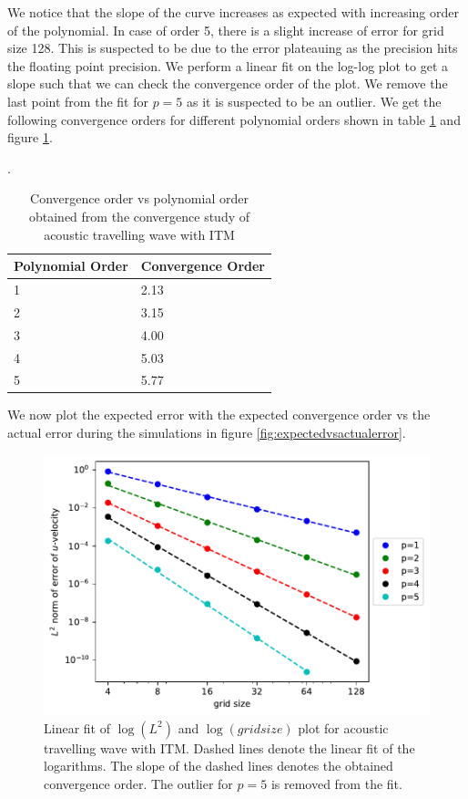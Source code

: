 We notice that the slope of the curve increases as expected with increasing order of the polynomial. In case of order 5, there is a slight increase
of error for grid size 128. This is suspected to be due to the error plateauing as the precision hits the floating point precision. We perform a linear fit on the log-log
plot to get a slope such that we can check the convergence order of the plot. We remove the last point from the fit for $p=5$ as it is suspected to be an outlier. 
We get the following convergence orders for different polynomial orders shown in table \ref{table:convergenceorder} and figure \ref{fig:convergenceorder}.

\begin{center}
\begin{table}[htpb]
    \centering
    \caption{Convergence order vs polynomial order obtained from the convergence study of acoustic travelling wave with \ac{ITM}}.
    \label{table:convergenceorder}
    \begin{tabular}{|l|l|}
        \hline
     \textbf{Polynomial Order}& \textbf{Convergence Order}  \\
     \hline
     1 & 2.13\\
     \hline
     2 & 3.15 \\
     \hline
     3 & 4.00 \\
     \hline
     4 & 5.03 \\
        \hline
        5 & 5.77\\
        \hline
    \end{tabular}
    \end{table}
\end{center}
We now plot the expected error with the expected convergence order vs the actual error during the simulations in figure \ref{fig:expectedvsactualerror}.
\begin{figure}[htpb]
    \centering
    \includegraphics[width=0.75\linewidth]{figures/error2.pdf}
    \caption{Linear fit of $\log\left(L^2\right)$ and $\log\left(grid size\right)$  plot for acoustic travelling wave with \ac{ITM}. Dashed lines denote the linear fit of the logarithms. The slope of the dashed lines denotes the obtained convergence order. The outlier for $p=5$ is removed from the fit.}
    \label{fig:convergenceorder}
\end{figure}
